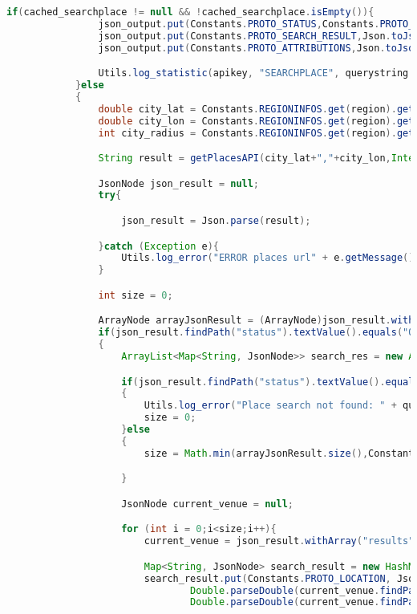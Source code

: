 \begin{lstlisting}[language=Java,basicstyle=\tiny,caption=Application.java]
            if(cached_searchplace != null && !cached_searchplace.isEmpty()){
                json_output.put(Constants.PROTO_STATUS,Constants.PROTO_STATUS_OK);
                json_output.put(Constants.PROTO_SEARCH_RESULT,Json.toJson(Json.parse(cached_searchplace)));
                json_output.put(Constants.PROTO_ATTRIBUTIONS,Json.toJson(NullNode.getInstance()));

                Utils.log_statistic(apikey, "SEARCHPLACE", querystring + "/cache");
            }else
            {
                double city_lat = Constants.REGIONINFOS.get(region).getLat();
                double city_lon = Constants.REGIONINFOS.get(region).getLon();
                int city_radius = Constants.REGIONINFOS.get(region).getRadius();

                String result = getPlacesAPI(city_lat+","+city_lon,Integer.toString(city_radius),querystring);

                JsonNode json_result = null;
                try{

                    json_result = Json.parse(result);

                }catch (Exception e){
                    Utils.log_error("ERROR places url" + e.getMessage());
                }

                int size = 0;

                ArrayNode arrayJsonResult = (ArrayNode)json_result.withArray("results");
                if(json_result.findPath("status").textValue().equals("OK") || json_result.findPath("status").textValue().equals("ZERO_RESULTS") )
                {
                    ArrayList<Map<String, JsonNode>> search_res = new ArrayList<Map<String, JsonNode>>();

                    if(json_result.findPath("status").textValue().equals("ZERO_RESULTS"))
                    {
                        Utils.log_error("Place search not found: " + querystring);
                        size = 0;
                    }else
                    {
                        size = Math.min(arrayJsonResult.size(),Constants.SEARCH_MAXRESULT);

                    }

                    JsonNode current_venue = null;

                    for (int i = 0;i<size;i++){
                        current_venue = json_result.withArray("results").get(i);

                        Map<String, JsonNode> search_result = new HashMap<String, JsonNode>();
                        search_result.put(Constants.PROTO_LOCATION, Json.toJson(String.format("%.5f,%.5f",
                                Double.parseDouble(current_venue.findPath("geometry").findPath("location").findPath("lat").toString()),
                                Double.parseDouble(current_venue.findPath("geometry").findPath("location").findPath("lng").toString()))));


\end{lstlisting}
